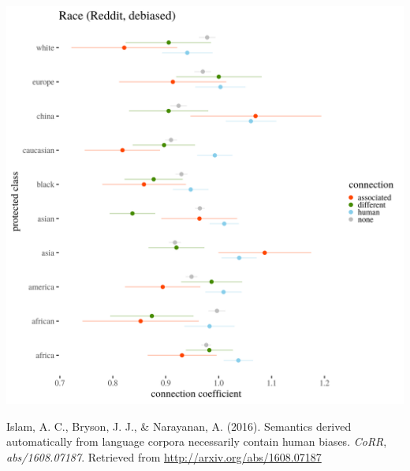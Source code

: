 \documentclass[12pt,]{book}
\begin{document}
\includegraphics[width=14cm]{../images/visDebRaceReddit.png}

\hypertarget{refs}{}
\hypertarget{ref-Caliskan2017Semantics}{}
Islam, A. C., Bryson, J. J., \& Narayanan, A. (2016). Semantics derived
automatically from language corpora necessarily contain human biases.
\emph{CoRR}, \emph{abs/1608.07187}. Retrieved from
\url{http://arxiv.org/abs/1608.07187}
\end{document}
